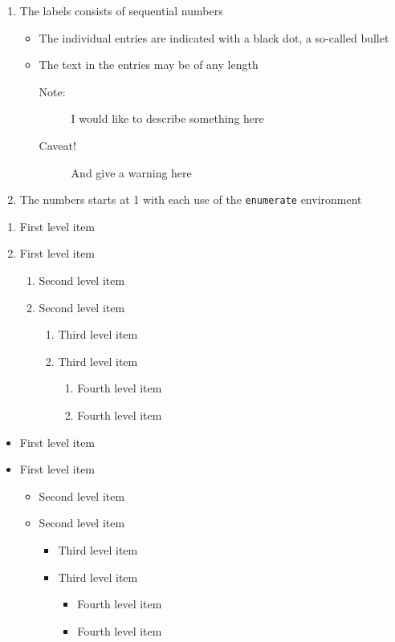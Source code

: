 \documentclass{article}
\begin{document}
\begin{enumerate}
    \item The labels consists of sequential numbers
    \begin{itemize}
      \item The individual entries are indicated with a black dot, a so-called bullet
      \item The text in the entries may be of any length
      \begin{description}
      \item[Note:] I would like to describe something here
      \item[Caveat!] And give a warning here
      \end{description}
    \end{itemize}
    \item The numbers starts at 1 with each use of the \texttt{enumerate} environment
 \end{enumerate}

\begin{enumerate}
   \item First level item
   \item First level item
   \begin{enumerate}
     \item Second level item
     \item Second level item
     \begin{enumerate}
       \item Third level item
       \item Third level item
       \begin{enumerate}
         \item Fourth level item
         \item Fourth level item
       \end{enumerate}
     \end{enumerate}
   \end{enumerate}
 \end{enumerate}

\par

\begin{itemize}
   \item First level item
   \item First level item
   \begin{itemize}
     \item Second level item
     \item Second level item
     \begin{itemize}
       \item Third level item
       \item Third level item
       \begin{itemize}
         \item Fourth level item
         \item Fourth level item
       \end{itemize}
     \end{itemize}
   \end{itemize}
 \end{itemize}
\end{document}
